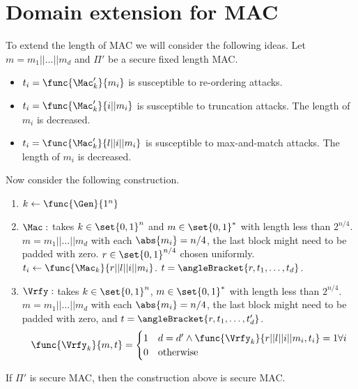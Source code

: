 \section{Domain extension for MAC}
To extend the length of MAC we will consider the following ideas. Let \(m = m_1 || \dots || m_d\) and \(\Pi'\) be a secure fixed length MAC. 
\begin{itemize}
    \item \(t_i = \func{\Mac_k'}{m_i}\) is susceptible to re-ordering attacks.
    \item \(t_i = \func{\Mac_k'}{i || m_i}\) is susceptible to truncation attacks. The length of \(m_i\) is decreased.
    \item \(t_i = \func{\Mac_k'}{l|| i || m_i}\) is susceptible to max-and-match attacks. The length of \(m_i\) is decreased.
\end{itemize}
Now consider the following construction.
\begin{enumerate}
    \item \(k \gets \func{\Gen}{1^n}\)
    \item \(\Mac:\) takes \(k \in \set{0,1}^n\) and \(m \in \set{0,1}^{\ast}\) with length less than \(2^{n/4}\). \(m = m_1 || \dots || m_d\) with each \(\abs{m_i}= n/4\), the last block might need to be padded with zero. \(r \in \set{0,1}^{n/4}\) chosen uniformly. \(t_i \gets \func{\Mac_k}{r||l||i||m_i}\). \(t = \angleBracket{r,t_1, \dots ,t_d}\).
    \item \(\Vrfy:\) takes \(k \in \set{0,1}^n\), \(m \in \set{0,1}^{\ast}\) with length less than \(2^{n/4}\). \(m = m_1 || \dots || m_d\) with each \(\abs{m_i}= n/4\), the last block might need to be padded with zero, and \(t = \angleBracket{r,t_1, \dots , t_d'}\). 
    \begin{equation*}
        \func{\Vrfy_k}{m,t} = \begin{cases}
            1 & d = d' \land \func{\Vrfy_k}{r || l ||i|| m_i, t_i} = 1 \forall i\\
            0 & \text{otherwise}
        \end{cases}
    \end{equation*} 
\end{enumerate}

\begin{theorem}
    If \(\Pi'\) is secure MAC, then the construction above is secure MAC.
\end{theorem}

